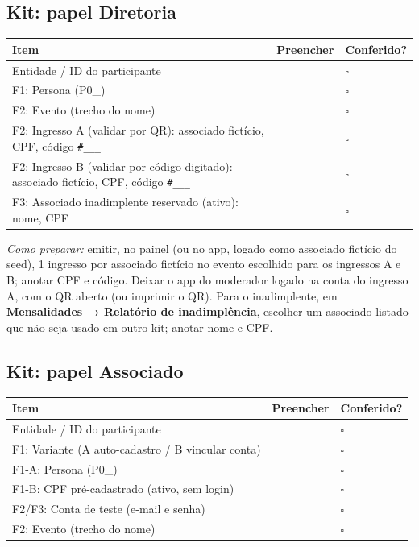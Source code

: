 \documentclass[11pt,a4paper]{article}
\begin{document}
\subsection*{Kit: papel Diretoria}

\begin{center}
\small
\begin{longtable}{p{7.5cm}p{3.3cm}p{2cm}}
\toprule
\textbf{Item} & \textbf{Preencher} & \textbf{Conferido?} \\
\midrule
\endhead
Entidade / ID do participante & & $\square$ \\
F1: Persona (P0\_) & & $\square$ \\
F2: Evento (trecho do nome) & & $\square$ \\
F2: Ingresso A (validar por QR): associado fictício, CPF, código \texttt{\#\_\_\_} & &
  $\square$ \\
F2: Ingresso B (validar por código digitado): associado fictício, CPF, código \texttt{\#\_\_\_}
  & & $\square$ \\
F3: Associado inadimplente reservado (ativo): nome, CPF & & $\square$ \\
\bottomrule
\end{longtable}
\end{center}

\textit{Como preparar:} emitir, no painel (ou no app, logado como associado fictício do seed), 1
ingresso por associado fictício no evento escolhido para os ingressos A e B; anotar CPF e código.
Deixar o app do moderador logado na conta do ingresso A, com o QR aberto (ou imprimir o QR). Para
o inadimplente, em \textbf{Mensalidades → Relatório de inadimplência}, escolher um associado
listado que não seja usado em outro kit; anotar nome e CPF.

\subsection*{Kit: papel Associado}

\begin{center}
\small
\begin{longtable}{p{7.5cm}p{3.3cm}p{2cm}}
\toprule
\textbf{Item} & \textbf{Preencher} & \textbf{Conferido?} \\
\midrule
\endhead
Entidade / ID do participante & & $\square$ \\
F1: Variante (A auto-cadastro / B vincular conta) & & $\square$ \\
F1-A: Persona (P0\_) & & $\square$ \\
F1-B: CPF pré-cadastrado (ativo, sem login) & & $\square$ \\
F2/F3: Conta de teste (e-mail e senha) & & $\square$ \\
F2: Evento (trecho do nome) & & $\square$ \\
\bottomrule
\end{longtable}
\end{center}
\end{document}
